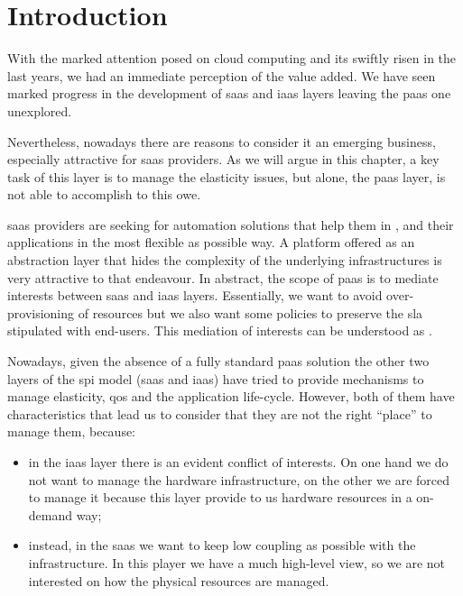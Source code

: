 %
%
\section{Introduction}
\label{sec:elasticity-introduction}
With the marked attention posed on cloud computing and its swiftly risen in the last years, we had
an immediate perception of the value added. We have seen marked progress in the development of
\ac{saas} and \ac{iaas} layers leaving the \ac{paas} one unexplored.

Nevertheless, nowadays there are reasons to consider it an emerging business, especially attractive
for \ac{saas} providers. As we will argue in this chapter, a key task of this layer is
to manage the elasticity issues, but alone, the \ac{paas} layer, is not able to accomplish to this owe.

\ac{saas} providers are seeking for automation solutions that help them in ,
 and  their applications in the most flexible as possible way. A
platform offered as an abstraction layer that hides the complexity of the underlying infrastructures
is very attractive to that endeavour. In abstract, the scope of \ac{paas} is to mediate interests
between \ac{saas} and \ac{iaas} layers. Essentially, we want to avoid over-provisioning of resources
but we also want some policies to preserve the \ac{sla} stipulated with end-users. This mediation
of interests can be understood as .

Nowadays, given the absence of a fully standard \ac{paas} solution the other two layers of the \ac{spi}
model (\ac{saas} and \ac{iaas}) have tried to provide mechanisms to manage elasticity, \ac{qos} and the
application life-cycle. However, both of them have characteristics that lead us to consider that they are
not the right ``place'' to manage them, because:

\begin{itemize}
	\item{in the \ac{iaas} layer there is an evident conflict of interests. On one hand we do not want
		to manage the hardware infrastructure, on the other we are forced to manage it because this layer
		provide to us hardware resources in a on-demand way;}
	\item{instead, in the \ac{saas} we want to keep low coupling as possible with the infrastructure.
		In this player we have a much high-level view, so we are not interested on how the physical resources
		are managed.}
\end{itemize}

